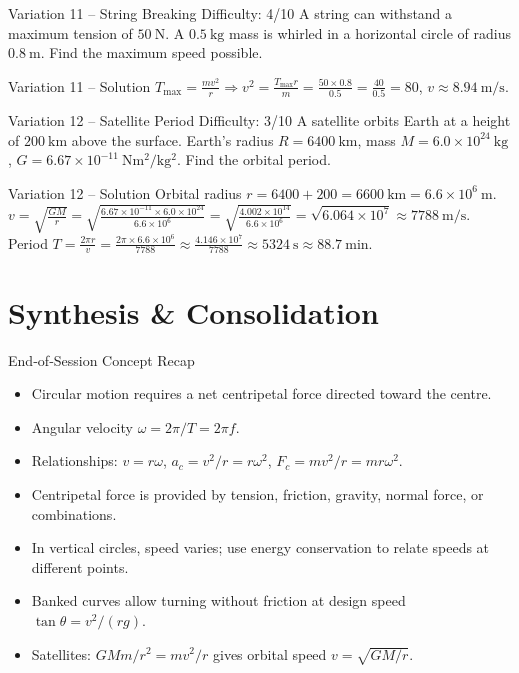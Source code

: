 \documentclass[11pt]{beamer}
\begin{document}
\begin{frame}[shrink=15]{Variation 11 – String Breaking \hfill Difficulty: 4/10}
A string can withstand a maximum tension of $50\ \mathrm{N}$. A $0.5\ \mathrm{kg}$ mass is whirled in a horizontal circle of radius $0.8\ \mathrm{m}$. Find the maximum speed possible.
\end{frame}

\begin{frame}{Variation 11 – Solution}
$T_{\max} = \frac{mv^2}{r} \Rightarrow v^2 = \frac{T_{\max} r}{m} = \frac{50\times0.8}{0.5} = \frac{40}{0.5} = 80$, $v \approx 8.94\ \mathrm{m/s}$.
\end{frame}

\begin{frame}[shrink=15]{Variation 12 – Satellite Period \hfill Difficulty: 3/10}
A satellite orbits Earth at a height of $200\ \mathrm{km}$ above the surface. Earth's radius $R = 6400\ \mathrm{km}$, mass $M = 6.0\times10^{24}\ \mathrm{kg}$, $G = 6.67\times10^{-11}\ \mathrm{Nm^2/kg^2}$. Find the orbital period.
\end{frame}

\begin{frame}{Variation 12 – Solution}
Orbital radius $r = 6400 + 200 = 6600\ \mathrm{km} = 6.6\times10^6\ \mathrm{m}$.
$v = \sqrt{\frac{GM}{r}} = \sqrt{\frac{6.67\times10^{-11}\times6.0\times10^{24}}{6.6\times10^6}} = \sqrt{\frac{4.002\times10^{14}}{6.6\times10^6}} = \sqrt{6.064\times10^7} \approx 7788\ \mathrm{m/s}$.
Period $T = \frac{2\pi r}{v} = \frac{2\pi\times6.6\times10^6}{7788} \approx \frac{4.146\times10^7}{7788} \approx 5324\ \mathrm{s} \approx 88.7\ \mathrm{min}$.
\end{frame}

\section{Synthesis \& Consolidation}

\begin{frame}{End‑of‑Session Concept Recap}
\begin{itemize}
    \item Circular motion requires a net centripetal force directed toward the centre.
    \item Angular velocity $\omega = 2\pi/T = 2\pi f$.
    \item Relationships: $v = r\omega$, $a_c = v^2/r = r\omega^2$, $F_c = mv^2/r = mr\omega^2$.
    \item Centripetal force is provided by tension, friction, gravity, normal force, or combinations.
    \item In vertical circles, speed varies; use energy conservation to relate speeds at different points.
    \item Banked curves allow turning without friction at design speed $\tan\theta = v^2/(rg)$.
    \item Satellites: $GMm/r^2 = mv^2/r$ gives orbital speed $v = \sqrt{GM/r}$.
\end{itemize}
\end{frame}
\end{document}
